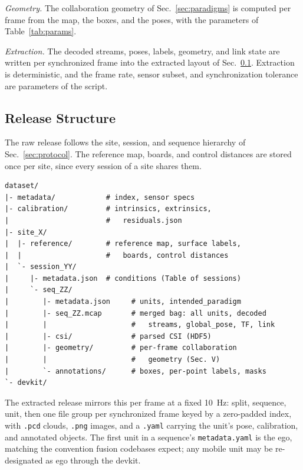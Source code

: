 \documentclass[journal]{IEEEtran}
\begin{document}
\emph{Geometry.} The collaboration geometry of
Sec.~\ref{sec:paradigms} is computed per frame from the map, the
boxes, and the poses, with the parameters of Table~\ref{tab:params}.

\emph{Extraction.} The decoded streams, poses, labels, geometry, and
link state are written per synchronized frame into the extracted
layout of Sec.~\ref{sec:structure}. Extraction is deterministic, and
the frame rate, sensor subset, and synchronization tolerance are
parameters of the script.

\subsection{Release Structure}
\label{sec:structure}
The raw release follows the site, session, and sequence hierarchy of
Sec.~\ref{sec:protocol}. The reference map, boards, and control
distances are stored once per site, since every session of a site
shares them.

{\scriptsize
\begin{verbatim}
dataset/
|- metadata/            # index, sensor specs
|- calibration/         # intrinsics, extrinsics,
|                       #   residuals.json
|- site_X/
|  |- reference/        # reference map, surface labels,
|  |                    #   boards, control distances
|  `- session_YY/
|     |- metadata.json  # conditions (Table of sessions)
|     `- seq_ZZ/
|        |- metadata.json     # units, intended_paradigm
|        |- seq_ZZ.mcap       # merged bag: all units, decoded
|        |                    #   streams, global_pose, TF, link
|        |- csi/              # parsed CSI (HDF5)
|        |- geometry/         # per-frame collaboration
|        |                    #   geometry (Sec. V)
|        `- annotations/      # boxes, per-point labels, masks
`- devkit/
\end{verbatim}
}

The extracted release mirrors this per frame at a fixed
\SI{10}{\hertz}: split, sequence, unit, then one file group per
synchronized frame keyed by a zero-padded index, with \texttt{.pcd}
clouds, \texttt{.png} images, and a \texttt{.yaml} carrying the
unit's pose, calibration, and annotated objects. The first unit in a
sequence's \texttt{metadata.yaml} is the ego, matching the convention
fusion codebases expect; any mobile unit may be re-designated as ego
through the devkit.
\end{document}
